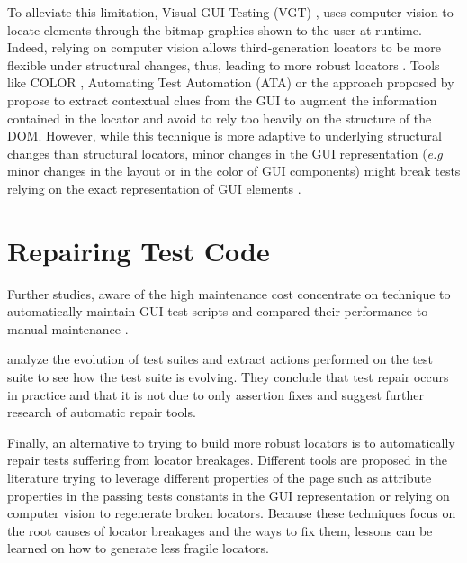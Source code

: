 To alleviate this limitation, Visual GUI Testing (VGT) \cite{Bosch2014}, uses computer vision to locate elements through the bitmap graphics shown to the user at runtime. Indeed, relying on computer vision allows third-generation locators to be more flexible under structural changes, thus, leading to more robust locators \cite{Leotta2014b}. Tools like COLOR \cite{Kirinuki2019}, Automating Test Automation (ATA) \cite{Thummalapenta2013} or the approach proposed by \textcite{Yandrapally2014} propose to extract contextual clues from the GUI to augment the information contained in the locator and avoid to rely too heavily on the structure of the DOM. However, while this technique is more adaptive to underlying structural changes than structural locators, minor changes in the GUI representation (\emph{e.g} minor changes in the layout or in the color of GUI components) might break tests relying on the exact representation of GUI elements \cite{Aldalur2017, Alegroth2018}.

\section{Repairing Test Code}
\label{sec:related-repair}

Further studies, aware of the high maintenance cost concentrate on technique to automatically maintain GUI test scripts and compared their performance to manual maintenance \cite{Grechanik2009, Grechanik2009b}.

\textcite{Pinto2012} analyze the evolution of test suites and extract actions performed on the test suite to see how the test suite is evolving. They conclude that test repair occurs in practice and that it is not due to only assertion fixes and suggest further research of automatic repair tools.

Finally, an alternative to trying to build more robust locators is to automatically repair tests suffering from locator breakages. Different tools are proposed in the literature trying to leverage different properties of the page such as attribute properties in the passing tests\cite{Choudhary2011} constants in the GUI representation\cite{Kirinuki2019} or relying on computer vision\cite{Stocco2018} to regenerate broken locators. Because these techniques focus on the root causes of locator breakages and the ways to fix them, lessons can be learned on how to generate less fragile locators.
